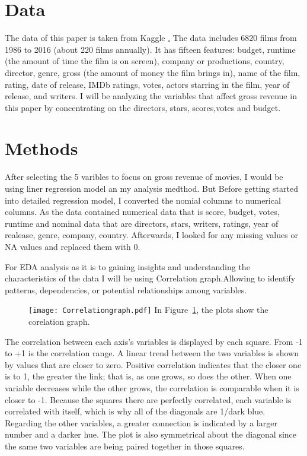 \documentclass[12pt]{article}
\begin{document}
\section{Data}
\label{sec:data}

The data of this paper is taken from Kaggle \href{https://www.kaggle.com/datasets/danielgrijalvas/movies}. 
The data includes 6820 films from 1986 to 2016 (about 220 films annually). It has
fifteen features: budget, runtime (the amount of time the film is on screen), company 
or productions, country, director, genre, gross (the amount of money the film brings in), 
name of the film, rating, date of release, IMDb ratings, votes, actors starring in the
film, year of release, and writers. I will be analyzing the variables that affect
gross revenue in this paper by concentrating on the directors, stars, scores,votes and budget.

\section{Methods}
\label{sec:meth}

After selecting the 5 varibles to focus on gross revenue of movies, I would be using
liner regression model an my analysis medthod. But Before getting started into detailed 
regression model, I converted the nomial columns to numerical columns. As the data contained 
numerical data that is score, budget, votes, runtime and nominal data that are directors, 
stars, writers, ratings, year of realease, genre, company, country. Afterwards, I looked 
for any missing values or NA values and replaced them with 0.

For EDA analysis as it is to gaining insights and understanding the characteristics 
of the data I will be using Correlation graph.Allowing to identify patterns, dependencies,
or potential relationships among variables.

\begin{figure}
  \centering
	\texttt{[image: Correlationgraph.pdf]}
	\label{fig:Correlationgraph}
In Figure~\ref{fig:Correlationgraph}, the plots show the corelation graph.
\end{figure}

The correlation between each axis’s variables is displayed by each square. From 
-1 to +1 is the correlation range. A linear trend between the two variables is shown
by values that are closer to zero. Positive correlation indicates that the closer one 
is to 1, the greater the link; that is, as one grows, so does the other. When one variable 
decreases while the other grows, the correlation is comparable when it is closer to -1.
Because the squares there are perfectly correlated, each variable is correlated with itself,
which is why all of the diagonals are 1/dark blue. Regarding the other variables, a greater 
connection is indicated by a larger number and a darker hue. The plot is also symmetrical
about the diagonal since the same two variables are being paired together in those squares.
\end{document}

